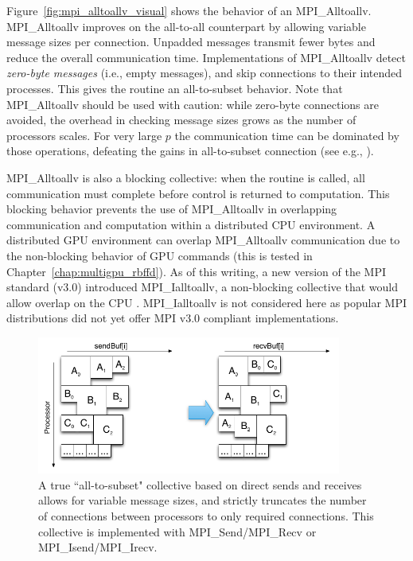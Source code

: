 \documentclass{report}
\begin{document}
Figure~\ref{fig:mpi_alltoallv_visual} shows the behavior of an MPI\_Alltoallv. MPI\_Alltoallv improves on the all-to-all counterpart by allowing variable message sizes per connection. Unpadded messages transmit fewer bytes and reduce the overall communication time. Implementations of MPI\_Alltoallv detect \emph{zero-byte messages} (i.e., empty messages), and skip connections to their intended processes. This gives the routine an all-to-subset behavior. Note that MPI\_Alltoallv should be used with caution: while zero-byte connections are avoided, the overhead in checking message sizes grows as the number of processors scales. For very large $p$ the communication time can be dominated by those operations, defeating the gains in all-to-subset connection (see e.g., \cite{Balaji2010}). 


%

MPI\_Alltoallv is also a blocking collective: when the routine is called, all communication must complete before control is returned to computation. This blocking behavior prevents the use of MPI\_Alltoallv in overlapping communication and computation within a distributed CPU environment. A distributed GPU environment can overlap MPI\_Alltoallv communication due to the non-blocking behavior of GPU commands (this is tested in Chapter~\ref{chap:multigpu_rbffd}). As of this writing, a new version of the MPI standard (v3.0) introduced MPI\_Ialltoallv, a non-blocking collective that would allow overlap on the CPU \cite{MPI}. MPI\_Ialltoallv is not considered here as popular MPI distributions did not yet offer MPI v3.0 compliant implementations.

\begin{figure}
\centering
\includegraphics[width=10cm]{../figures/omnigraffle/MPI_IsendIrecv_Visual.png}
\caption{A true ``all-to-subset" collective based on direct sends and receives allows for variable message sizes, and strictly truncates the number of connections between processors to only required connections. This collective is implemented with MPI\_Send/MPI\_Recv or MPI\_Isend/MPI\_Irecv.}
\label{fig:mpi_isendirecv_visual}
\end{figure}
\end{document}
